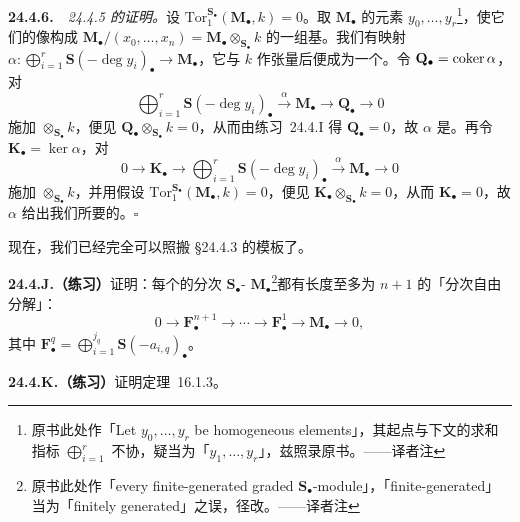 \textbf{24.4.6.}\ \emph{\mbox{\trhProposition~24.4.5} 的证明。}\quad 设 $\mathrm{Tor}_1^{\mathbf{S}_\bullet}(\mathbf{M}_\bullet,k)=0$。取 $\mathbf{M}_\bullet$ 的\trHomogeneous{}元素 $y_0,\dots,y_r$\footnote{原书此处作「Let $y_0,\dots,y_r$ be homogeneous elements」，其起点与下文的求和指标 $\bigoplus_{i=1}^{r}$ 不协，疑当为「$y_1,\dots,y_r$」，兹照录原书。——译者注}，使它们的像构成 $\mathbf{M}_\bullet/(x_0,\dots,x_n)=\mathbf{M}_\bullet\otimes_{\mathbf{S}_\bullet}k$ 的一组基。我们有映射 $\alpha\colon\bigoplus_{i=1}^{r}\mathbf{S}(-\deg y_i)_\bullet\to\mathbf{M}_\bullet$，它与 $k$ 作张量后便成为一个\trIsomorphism。令 $\mathbf{Q}_\bullet=\operatorname{coker}\alpha$，对
\[
\bigoplus_{i=1}^{r}\mathbf{S}(-\deg y_i)_\bullet \overset{\alpha}{\longrightarrow} \mathbf{M}_\bullet \longrightarrow \mathbf{Q}_\bullet \longrightarrow 0
\]
施加 $\otimes_{\mathbf{S}_\bullet}k$，便见 $\mathbf{Q}_\bullet\otimes_{\mathbf{S}_\bullet}k=0$，从而由\mbox{练习~24.4.I} 得 $\mathbf{Q}_\bullet=0$，故 $\alpha$ 是\trSurjectiveMap。再令 $\mathbf{K}_\bullet=\ker\alpha$，对
\[
0 \longrightarrow \mathbf{K}_\bullet \longrightarrow \bigoplus_{i=1}^{r}\mathbf{S}(-\deg y_i)_\bullet \overset{\alpha}{\longrightarrow} \mathbf{M}_\bullet \longrightarrow 0
\]
施加 $\otimes_{\mathbf{S}_\bullet}k$，并用假设 $\mathrm{Tor}_1^{\mathbf{S}_\bullet}(\mathbf{M}_\bullet,k)=0$，便见 $\mathbf{K}_\bullet\otimes_{\mathbf{S}_\bullet}k=0$，从而 $\mathbf{K}_\bullet=0$，故 $\alpha$ 给出我们所要的\trIsomorphism。\hfill$\square$

现在，我们已经完全可以照搬 \S24.4.3 的模板了。

\textbf{24.4.J.（练习）}\quad 证明：每个\trFinitelyGenerated{}的分次 $\mathbf{S}_\bullet$-\trModule{} $\mathbf{M}_\bullet$\footnote{原书此处作「every finite-generated graded $\mathbf{S}_\bullet$-module」，「finite-generated」当为「finitely generated」之误，径改。——译者注}都有长度至多为 $n+1$ 的「分次自由分解」：
\[
0 \longrightarrow \mathbf{F}_\bullet^{n+1} \longrightarrow \cdots \longrightarrow \mathbf{F}_\bullet^{1} \longrightarrow \mathbf{M}_\bullet \longrightarrow 0,
\]
其中 $\mathbf{F}_\bullet^q=\bigoplus_{i=1}^{j_q}\mathbf{S}(-a_{i,q})_\bullet$。

\textbf{24.4.K.（练习）}\quad 证明\mbox{\trHilbert{}\trSyzygy{}定理~16.1.3}。
